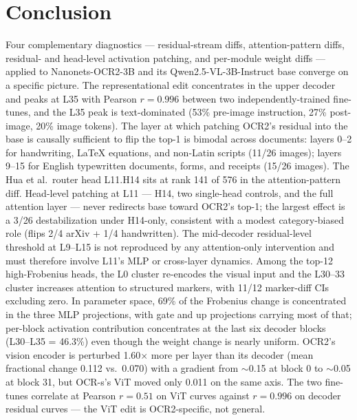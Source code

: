 \documentclass[10pt,twocolumn,letterpaper]{article}
\begin{document}
\section{Conclusion}
\label{sec:conclusion}

Four complementary diagnostics --- residual-stream diffs, attention-pattern diffs, residual- and head-level activation patching, and per-module weight diffs --- applied to Nanonets-OCR2-3B and its Qwen2.5-VL-3B-Instruct base converge on a specific picture. The representational edit concentrates in the upper decoder and peaks at L35 with Pearson $r = 0.996$ between two independently-trained fine-tunes, and the L35 peak is text-dominated (53\% pre-image instruction, 27\% post-image, 20\% image tokens). The layer at which patching OCR2's residual into the base is causally sufficient to flip the top-1 is bimodal across documents: layers 0--2 for handwriting, LaTeX equations, and non-Latin scripts (11/26 images); layers 9--15 for English typewritten documents, forms, and receipts (15/26 images). The Hua et al.\ router head L11.H14 sits at rank 141 of 576 in the attention-pattern diff. Head-level patching at L11 --- H14, two single-head controls, and the full attention layer --- never redirects base toward OCR2's top-1; the largest effect is a 3/26 destabilization under H14-only, consistent with a modest category-biased role (flips 2/4 arXiv + 1/4 handwritten). The mid-decoder residual-level threshold at L9--L15 is not reproduced by any attention-only intervention and must therefore involve L11's MLP or cross-layer dynamics. Among the top-12 high-Frobenius heads, the L0 cluster re-encodes the visual input and the L30--33 cluster increases attention to structured markers, with 11/12 marker-diff CIs excluding zero. In parameter space, 69\% of the Frobenius change is concentrated in the three MLP projections, with gate and up projections carrying most of that; per-block activation contribution concentrates at the last six decoder blocks (L30--L35 = 46.3\%) even though the weight change is nearly uniform. OCR2's vision encoder is perturbed 1.60$\times$ more per layer than its decoder (mean fractional change 0.112 vs.\ 0.070) with a gradient from $\sim$0.15 at block 0 to $\sim$0.05 at block 31, but OCR-s's ViT moved only 0.011 on the same axis. The two fine-tunes correlate at Pearson $r = 0.51$ on ViT curves against $r = 0.996$ on decoder residual curves --- the ViT edit is OCR2-specific, not general.
\end{document}

